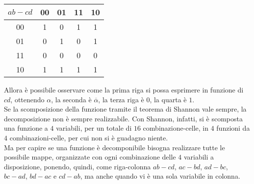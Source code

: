 \documentclass[a4paper]{extarticle}
\renewcommand\arraystretch{}
\begin{document}
\vspace{1em}
\noindent
\begin{table}[H]
\setlength{\tabcolsep}{4pt}
\renewcommand{\arraystretch}{1.2}
\centering
\begin{tabular}{|c|c|c|c|c|}
    \hline
    $ab-cd$ & 00 & 01 & 11 & 10\\
    \hline
    00 & 1  & 0 & 1 & 1\\ 
    \hline
    01 & 0 & 1 & 0 & 1\\ 
    \hline
    11 & 0 & 0 & 0 & 0\\
    \hline
    10 & 1 & 1 & 1 & 1\\
    \hline
\end{tabular}
\end{table}

\vspace{1em}
\noindent
Allora è possibile osservare come la prima riga si possa esprimere in funzione di $cd$, ottenendo $\alpha$, la seconda è $\overline{\alpha}$, la terza riga è $0$, la quarta è $1$.\\
Se la scomposizione della funzione tramite il teorema di Shannon vale sempre, la decomposizione non è sempre realizzabile. Con Shannon, infatti, si è scomposta una funzione a $4$ variabili, per un totale di $16$ combinazione-celle, in $4$ funzioni da $4$ combinazioni-celle, per cui non si è guadagno niente.\\
Ma per capire se una funzione è decomponibile bisogna realizzare tutte le possibile mappe, organizzate con ogni combinazione delle $4$ variabili a disposizione, ponendo, quindi, come riga-colonna $ab-cd$, $ac-bd$, $ad-bc$, $bc-ad$, $bd-ac$ e $cd-ab$, ma anche quando vi è una sola variabile in colonna.

\vspace{1em}
\noindent
\end{document}
